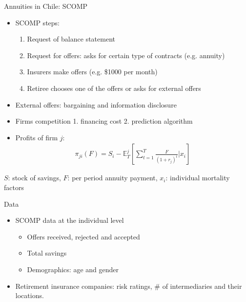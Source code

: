 \documentclass[10pt,aspectratio=169]{beamer}
\begin{document}
 
\begin{frame}{Annuities in Chile: SCOMP}  \label{slide:setting}
       
    \begin{itemize}%
    \item SCOMP steps: 
    \begin{enumerate}
        \item Request of balance statement 
        \item Request for offers: asks for certain type of contracts (e.g. annuity)
        \item Insurers make offers (e.g. \$1000 per month)
        \item Retiree chooses one of the offers or asks for external offers

    \end{enumerate}

        \item External offers: bargaining and information disclosure
    

    \item Firms competition 1. financing cost 2. prediction algorithm 

    \item Profits of firm $j$: 
    \begin{align*}
    \pi_{ji}(F) = S_i-  \mathbb{E}^j_{T} \left[\sum_{t=1}^T\frac{F}{(1+r_j)^t}|x_i \right]
    \end{align*}
    \end{itemize}

     $S$: stock of savings, $F$: per period annuity payment, $x_i$: individual mortality factors
\end{frame}


 \begin{frame}{Data} \label{slide:data}
\begin{itemize}
    \item SCOMP data at the individual level  
    \begin{itemize}
        \item Offers received, rejected and accepted 
        \item Total savings 
        \item Demographics: age and gender
    \end{itemize}
     \item Retirement insurance companies: risk ratings, \#  of intermediaries and their  locations.
\end{itemize}
\end{frame}
\end{document}
